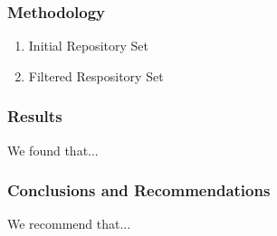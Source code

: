 \documentclass{beamer}
\begin{document}
\begin{frame}
  \frametitle{Methodology}
  \begin{enumerate}
    \item Initial Repository Set
    \item Filtered Respository Set
  \end{enumerate}
\end{frame}

\begin{frame}
  \frametitle{Results}
  We found that...
\end{frame}

\begin{frame}
  \frametitle{Conclusions and Recommendations}
  We recommend that...
\end{frame}
\end{document}
